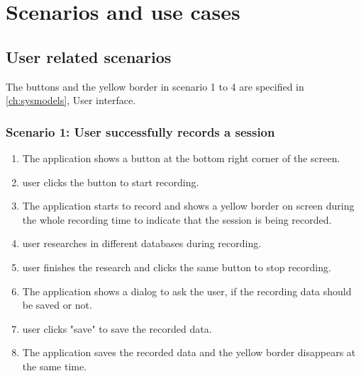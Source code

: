 \chapter{Scenarios and use cases}
\label{ch:scenarios}

\section{User related scenarios}
\newcommand{\see}[1][reference missing]{(see \specref{#1})}
The buttons and the yellow border in scenario 1 to 4 are specified in \autoref{ch:sysmodels}, User interface.

\subsection{Scenario 1: User successfully records a session}
\begin{enumerate}
    \item The application shows a button at the bottom right corner of the screen.
    \item \Gls{user} clicks the button to start recording.
    \item The application starts to record and shows a yellow border on screen during the whole recording time to indicate that the \gls{session} is being recorded.
    \item \Gls{user} researches in different databases during recording.
    \item \Gls{user} finishes the research and clicks the same button to stop recording.
    \item The application shows a dialog to ask the \gls{user}, if the recording data should be saved or not.
    \item \Gls{user} clicks "save" to save the recorded data.
    \item The application saves the recorded data and the yellow border disappears at the same time.
\end{enumerate}

